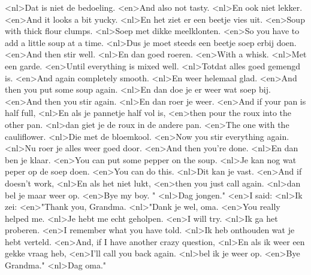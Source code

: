 <nl>Dat is niet de bedoeling.
<en>And also not tasty.
<nl>En ook niet lekker.
<en>And it looks a bit yucky.
<nl>En het ziet er een beetje vies uit.
<en>Soup with thick flour clumps.
<nl>Soep met dikke meelklonten.
<en>So you  have to add a little soup at a time.
<nl>Dus je moet steeds een beetje soep erbij doen.
<en>And then stir well.
<nl>En dan goed roeren.
<en>With a whisk.
<nl>Met een garde.
<en>Until everything is mixed well.
<nl>Totdat alles goed gemengd is.
<en>And again completely smooth.
<nl>En weer helemaal glad.
<en>And then you put some soup again.
<nl>En dan doe je er weer wat soep bij.
<en>And then you stir again.
<nl>En dan roer je weer.
<en>And if your pan is half full,
<nl>En als je pannetje half vol is,
<en>then pour the roux into the other pan.
<nl>dan giet je de roux in de andere pan.
<en>The one with the cauliflower.
<nl>Die met de bloemkool.
<en>Now you stir everything again.
<nl>Nu roer je alles weer goed door.
<en>And then you're done.
<nl>En dan ben je klaar.
<en>You can put some pepper on the soup.
<nl>Je kan nog wat peper op de soep doen.
<en>You can do this.
<nl>Dit kan je vast.
<en>And if doesn't work,
<nl>En als het niet lukt,
<en>then you just call again.
<nl>dan bel je maar weer op.
<en>Bye my boy. "
<nl>Dag jongen."
<en>I said:
<nl>Ik zei:
<en>"Thank you, Grandma.
<nl>"Dank je wel, oma.
<en>You really helped me.
<nl>Je hebt me echt geholpen.
<en>I will try.
<nl>Ik ga het proberen.
<en>I remember what you have told.
<nl>Ik heb onthouden wat je hebt verteld.
<en>And, if I have another crazy question,
<nl>En als ik weer een gekke vraag heb,
<en>I'll call you back again.
<nl>bel ik je weer op.
<en>Bye Grandma."
<nl>Dag oma."
